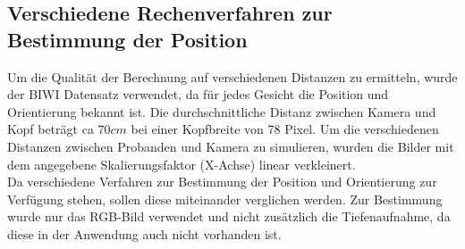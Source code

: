 \subsection{Verschiedene Rechenverfahren zur Bestimmung der Position}
Um die Qualität der Berechnung auf verschiedenen Distanzen zu ermitteln, wurde der BIWI Datensatz \cite{database_Face_Ori} verwendet, da für jedes Gesicht die Position und Orientierung bekannt ist.
Die durchschnittliche Distanz zwischen Kamera und Kopf beträgt ca $70cm$ bei einer Kopfbreite von 78 Pixel. Um die verschiedenen Distanzen zwischen Probanden und Kamera zu simulieren, wurden die Bilder mit dem angegebene Skalierungsfaktor (X-Achse) linear verkleinert.\\
Da verschiedene Verfahren zur Bestimmung der Position und Orientierung zur Verfügung stehen, sollen diese miteinander verglichen werden. Zur Bestimmung wurde nur das RGB-Bild verwendet und nicht zusätzlich die Tiefenaufnahme, da diese in der Anwendung auch nicht vorhanden ist.
